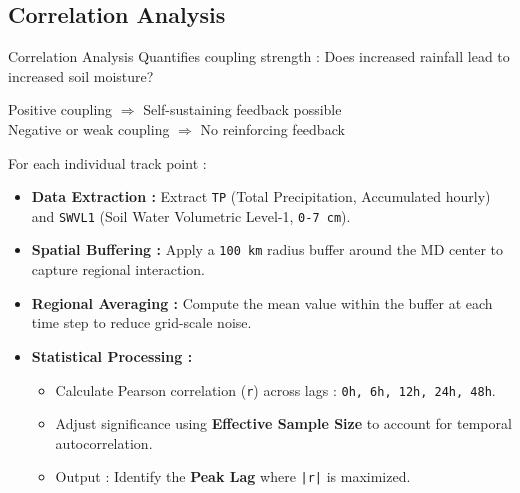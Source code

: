 \documentclass[8pt, aspectratio=169]{beamer}
\begin{document}
\subsection{Correlation Analysis}
\begin{frame}{Correlation Analysis}
    Quantifies coupling strength : Does increased rainfall lead to increased soil moisture?

    \vspace{0.2cm}
    Positive coupling $\Rightarrow$ Self-sustaining feedback possible \\
    Negative or weak coupling $\Rightarrow$ No reinforcing feedback

    \vspace{0.2cm}
    \footnotesize
    For each individual track point :
    \begin{itemize}
        \item \textbf{Data Extraction :} Extract \texttt{TP} (Total Precipitation, Accumulated hourly) and \texttt{SWVL1} (Soil Water Volumetric Level-1, \texttt{0-7 cm}).
        \item \textbf{Spatial Buffering :} Apply a \texttt{100 km} radius buffer around the MD center to capture regional interaction.
        \item \textbf{Regional Averaging :} Compute the mean value within the buffer at each time step to reduce grid-scale noise.
        \item \textbf{Statistical Processing :}
        \begin{itemize}
            \footnotesize
            \item Calculate Pearson correlation (\texttt{r}) across lags : \texttt{0h, 6h, 12h, 24h, 48h}.
            \item Adjust significance using \textbf{Effective Sample Size} to account for temporal autocorrelation.
            \item Output : Identify the \textbf{Peak Lag} where \texttt{|r|} is maximized.
        \end{itemize}
    \end{itemize}
\end{frame}
\end{document}
